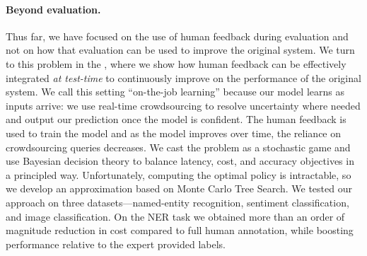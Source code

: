 \paragraph{Beyond evaluation.}
Thus far, we have focused on the use of human feedback during evaluation and not on how that evaluation can be used to improve the original system.
We turn to this problem in the , where we show how human feedback can be effectively integrated \textit{at test-time} to continuously improve on the performance of the original system.
We call this setting  ``on-the-job learning'' because our model learns as inputs arrive: we use real-time crowdsourcing to resolve uncertainty where needed and output our prediction once the model is confident.
The human feedback is used to train the model and as the model improves over time, the reliance on crowdsourcing queries decreases. 
We cast the problem as a stochastic game and use Bayesian decision theory to balance latency, cost, and accuracy objectives in a principled way. 
Unfortunately, computing the optimal policy is intractable, so we develop an approximation based on Monte Carlo Tree Search.
We tested our approach on three datasets---named-entity recognition, sentiment classification, and image classification.
On the NER task we obtained more than an order of magnitude reduction in cost compared to full human annotation, while boosting performance relative to the expert provided labels.

%






% 
% 
% 




